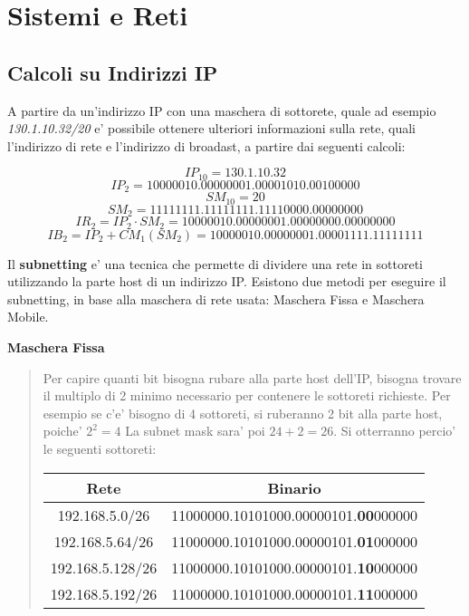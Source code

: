 \documentclass{article}
\begin{document}
  \pagebreak
  \section{Sistemi e Reti}
  {
    \subsection{Calcoli su Indirizzi IP}
    A partire da un'indirizzo IP con una maschera di sottorete, quale ad esempio \textit{130.1.10.32/20} e' possibile ottenere ulteriori informazioni sulla rete, quali l'indirizzo di rete e l'indirizzo di broadast, a partire dai seguenti calcoli:

    $$ IP_{10} = 130.1.10.32 $$ 
    $$ IP_{2} = 10000010.00000001.00001010.00100000 $$
    $$ SM_{10} = 20 $$
    $$ SM_{2} = 11111111.11111111.11110000.00000000 $$
    $$ IR_{2} = IP_{2} \cdot SM_{2} = 10000010.00000001.00000000.00000000 $$
    $$ IB_{2} = IP_{2} + CM_{1}(SM_{2}) = 10000010.00000001.00001111.11111111 $$

    Il \textbf{subnetting} e' una tecnica che permette di dividere una rete in sottoreti utilizzando la parte host di un indirizzo IP. Esistono due metodi per eseguire il subnetting, in base alla maschera di rete usata: Maschera Fissa e Maschera Mobile.

    \textbf{Maschera Fissa}
    \begin{quote}
      Per capire quanti bit bisogna rubare alla parte host dell'IP, bisogna trovare il multiplo di 2 minimo necessario per contenere le sottoreti richieste. Per esempio se c'e' bisogno di 4 sottoreti, si ruberanno 2 bit alla parte host, poiche' $ 2^2 = 4 $ La subnet mask sara' poi $ 24 + 2 = 26 $. Si otterranno percio' le seguenti sottoreti:

      \begin{tabular}{ |c|c| }
        \hline
        Rete & Binario \\
        \hline
        192.168.5.0/26 & 11000000.10101000.00000101.\textbf{00}000000 \\
        192.168.5.64/26 & 11000000.10101000.00000101.\textbf{01}000000 \\
        192.168.5.128/26 & 11000000.10101000.00000101.\textbf{10}000000 \\
        192.168.5.192/26 & 11000000.10101000.00000101.\textbf{11}000000 \\
        \hline
      \end{tabular}
    \end{quote}

}
\end{document}
